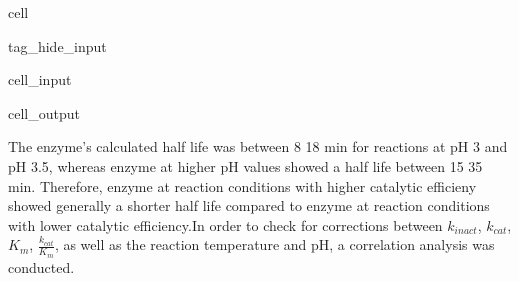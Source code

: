 \documentclass[letterpaper,10pt,english]{jupyterBook}
\begin{document}
\begin{sphinxuseclass}{cell}
\begin{sphinxuseclass}{tag_hide_input}\begin{sphinxVerbatimInput}

\begin{sphinxuseclass}{cell_input}
\begin{sphinxVerbatim}[commandchars=\\\{\}]
  \PYG{p}{[}\PYG{p}{]}
   
   

     
\end{sphinxVerbatim}

\end{sphinxuseclass}\end{sphinxVerbatimInput}
\begin{sphinxVerbatimOutput}

\begin{sphinxuseclass}{cell_output}
\noindent{}

\end{sphinxuseclass}\end{sphinxVerbatimOutput}

\end{sphinxuseclass}
\end{sphinxuseclass}
\sphinxAtStartPar
The enzyme’s calculated half life was between 8 \sphinxhyphen{} 18 min for reactions at pH 3 and pH 3.5, whereas enzyme at higher pH values showed a half life between 15 \sphinxhyphen{} 35 min. Therefore, enzyme at reaction conditions with higher catalytic efficieny showed generally a shorter half life compared to enzyme at reaction conditions with lower catalytic efficiency.In order to check for corrections between \(k_{inact}\), \(k_{cat}\), \(K_{m}\), \(\frac{k_{cat}}{K_{m}}\), as well as the reaction temperature and pH, a correlation analysis was conducted.
\end{document}

